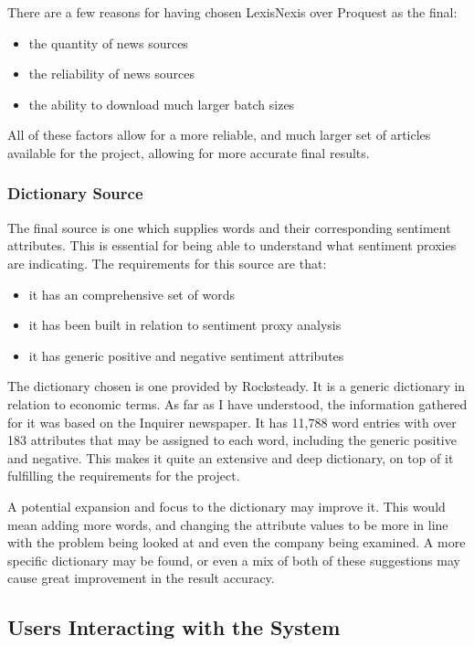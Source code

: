 There are a few reasons for having chosen LexisNexis over Proquest as the final:
\begin{itemize}
    \item the quantity of news sources
    \item the reliability of news sources
    \item the ability to download much larger batch sizes
\end{itemize}
All of these factors allow for a more reliable, and much larger set of articles available for the project, allowing for more accurate final results.

\subsubsection{Dictionary Source}

The final source is one which supplies words and their corresponding sentiment attributes. This is essential for being able to understand what sentiment proxies are indicating. The requirements for this source are that:
\begin{itemize}
    \item it has an comprehensive set of words
    \item it has been built in relation to sentiment proxy analysis
    \item it has generic positive and negative sentiment attributes
\end{itemize}
The dictionary chosen is one provided by Rocksteady. It is a generic dictionary in relation to economic terms. As far as I have understood, the information gathered for it was based on the Inquirer newspaper. It has 11,788 word entries with over 183 attributes that may be assigned to each word, including the generic positive and negative. This makes it quite an extensive and deep dictionary, on top of it fulfilling the requirements for the project.

A potential expansion and focus to the dictionary may improve it. This would mean adding more words, and changing the attribute values to be more in line with the problem being looked at and even the company being examined. A more specific dictionary may be found, or even a mix of both of these suggestions may cause great improvement in the result accuracy.

\subsection{Users Interacting with the System}

